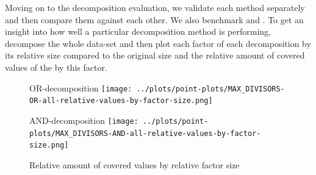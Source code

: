 Moving on to the decomposition evaluation, we validate each method separately and then compare them against each other.
We also benchmark \andDecomp and \orDecomp.
To get an insight into how well a particular decomposition method is performing, decompose the whole data-set and then plot each factor of each decomposition by its relative size compared to the original \DFA size and the relative amount of covered values of the \DFA by this factor.
\begin{figure}[t]
	\begin{minipage}[h]{0.49\linewidth}
		\centering
		OR-decomposition
		\texttt{[image: ../plots/point-plots/MAX\_DIVISORS-OR-all-relative-values-by-factor-size.png]}
	\end{minipage}
	\begin{minipage}[h]{0.49\linewidth}
		\centering
		AND-decomposition
		\texttt{[image: ../plots/point-plots/MAX\_DIVISORS-AND-all-relative-values-by-factor-size.png]}
	\end{minipage}
	\caption{Relative amount of covered values by relative factor size}
	\label{fig:eval:max-divisor-all-factors}
\end{figure}

